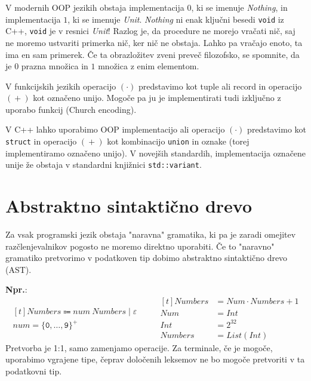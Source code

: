 \documentclass{report}
\newcommand{\Ex}{\textbf{Npr.}:\ }
\newcommand{\Null}{\varepsilon}
\newcommand{\Char}[1]{\texttt{#1}}
\newcommand{\Seq}{\cdot}
\newcommand{\Spc}{\ }
\newcommand{\Union}{\mathrel{|}}
\newcommand{\Sum}{\mathrel{+}}
\newcommand{\KleenePlus}[1]{#1^+}
\newcommand{\Arrow}{\Coloneq}
\newcommand{\NT}[1]{{#1}}
\newcommand{\T}[1]{{#1}}
\begin{document}
V modernih OOP jezikih obstaja implementacija $0$, ki se imenuje \emph{Nothing}, in implementacija $1$, ki se imenuje \emph{Unit}.
\emph{Nothing} ni enak ključni besedi \texttt{void} iz C++, \texttt{void} je v resnici \emph{Unit}!
Razlog je, da procedure ne morejo vračati nič, saj ne moremo ustvariti primerka nič, ker nič ne obstaja.
Lahko pa vračajo enoto, ta ima en sam primerek.
Če ta obrazložitev zveni preveč filozofsko, se spomnite, da je $0$ prazna množica in $1$ množica z enim elementom.

V funkcijskih jezikih operacijo ${(\Seq)}$ predstavimo kot tuple ali record in operacijo ${(\Sum)}$ kot označeno unijo.
Mogoče pa ju je implementirati tudi izključno z uporabo funkcij (Church encoding).

V C++ lahko uporabimo OOP implementacijo ali operacijo ${(\Seq)}$ predstavimo kot \texttt{struct} in operacijo ${(\Sum)}$ kot kombinacijo \texttt{union} in oznake (torej implementiramo označeno unijo).
V novejših standardih, implementacija označene unije že obstaja v standardni knjižnici \texttt{std::variant}.

\section{Abstraktno sintaktično drevo}
Za vsak programski jezik obstaja "naravna" gramatika, ki pa je zaradi omejitev razčlenjevalnikov pogosto ne moremo direktno uporabiti.
Če to "naravno" gramatiko pretvorimo v podatkoven tip dobimo abstraktno sintaktično drevo (AST).

\Ex
\begin{equation*}
  \begin{aligned}[t]
    \NT{Numbers} \Arrow \T{num} \Spc \NT{Numbers} \Union \Null\\[1em]
    \T{num} = \KleenePlus{\{\Char{0}, \dots, \Char{9}\}}
  \end{aligned}
  \qquad
  \begin{aligned}[t]
    Numbers &= Num \Seq Numbers \Sum 1\\
    Num &= Int\\
    Int &= 2^{32}\\
    Numbers &= List(Int)
  \end{aligned}
\end{equation*}
Pretvorba je 1:1, samo zamenjamo operacije.
Za terminale, če je mogoče, uporabimo vgrajene tipe, čeprav določenih leksemov ne bo mogoče pretvoriti v ta podatkovni tip.
\end{document}
